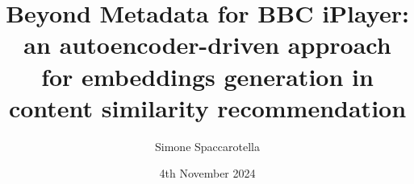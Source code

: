 \documentclass[12pt,a4paper]{article}
\begin{document}
\title{Beyond Metadata for BBC iPlayer:\\an autoencoder-driven approach for embeddings generation in content similarity recommendation}
\author{Simone Spaccarotella}
\date{4th November 2024}


\maketitle
\thispagestyle{empty}
\newpage

\tableofcontents
\lstlistoflistings
\listoffigures





















\end{document}
